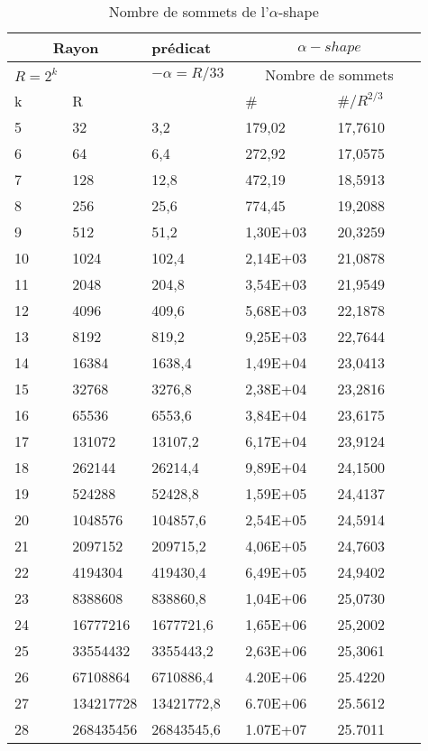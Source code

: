 \begin{table}[H]
  \begin{tabular}{|p{0.09\linewidth}|p{0.13\linewidth}||p{0.23\linewidth}||p{0.23\linewidth}|p{0.23\linewidth}|}
    \hline
    \multicolumn{2}{|c||}{Rayon} & prédicat               & \multicolumn{2}{|c|}{$\alpha-shape$} \\  \hline 
    $R=2^k$  &                   & $-\alpha = R/33$ & \multicolumn{2}{|c|}{Nombre de sommets} \\ \hline
    k        & R                 &                        & \# & $\# / R^{2/3}$ \\ 
    \hline
    5  & 32        & 3,2        & 179,02   & 17,7610\\
    6  & 64        & 6,4        & 272,92   & 17,0575\\
    7  & 128       & 12,8       & 472,19   & 18,5913\\
    8  & 256       & 25,6       & 774,45   & 19,2088\\
    9  & 512       & 51,2       & 1,30E+03 & 20,3259\\
    10 & 1024      & 102,4      & 2,14E+03 & 21,0878\\
    11 & 2048      & 204,8      & 3,54E+03 & 21,9549\\
    12 & 4096      & 409,6      & 5,68E+03 & 22,1878\\
    13 & 8192      & 819,2      & 9,25E+03 & 22,7644\\
    14 & 16384     & 1638,4     & 1,49E+04 & 23,0413\\
    15 & 32768     & 3276,8     & 2,38E+04 & 23,2816\\
    16 & 65536     & 6553,6     & 3,84E+04 & 23,6175\\
    17 & 131072    & 13107,2    & 6,17E+04 & 23,9124\\
    18 & 262144    & 26214,4    & 9,89E+04 & 24,1500\\
    19 & 524288    & 52428,8    & 1,59E+05 & 24,4137\\
    20 & 1048576   & 104857,6   & 2,54E+05 & 24,5914\\
    21 & 2097152   & 209715,2   & 4,06E+05 & 24,7603\\
    22 & 4194304   & 419430,4   & 6,49E+05 & 24,9402\\
    23 & 8388608   & 838860,8   & 1,04E+06 & 25,0730\\
    24 & 16777216  & 1677721,6  & 1,65E+06 & 25,2002\\
    25 & 33554432  & 3355443,2  & 2,63E+06 & 25,3061\\
    26 & 67108864  & 6710886,4  & 4.20E+06 & 25.4220\\
    27 & 134217728 & 13421772,8 & 6.70E+06 & 25.5612\\
    28 & 268435456 & 26843545,6 & 1.07E+07 & 25.7011\\
    \hline
  \end{tabular} 
  \caption{Nombre de sommets de l'$\alpha$-shape}
\end{table}


